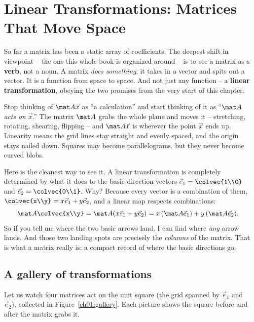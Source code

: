 \section{Linear Transformations: Matrices That Move Space}

So far a matrix has been a static array of coefficients. The deepest shift in viewpoint -- the one this
whole book is organized around -- is to see a matrix as a \textbf{verb}, not a noun. A matrix
\emph{does something}: it takes in a vector and spits out a vector. It is a function from space to
space. And not just any function -- a \textbf{linear transformation}, obeying the two promises from the
very start of this chapter.

\begin{intuitionbox}
Stop thinking of $\mat A\vec x$ as ``a calculation'' and start thinking of it as ``$\mat A$ \emph{acts
on} $\vec x$.'' The matrix $\mat A$ grabs the whole plane and moves it -- stretching, rotating,
shearing, flipping -- and $\mat A\vec x$ is wherever the point $\vec x$ ends up. Linearity means the
grid lines stay straight and evenly spaced, and the origin stays nailed down. Squares may become
parallelograms, but they never become curved blobs.
\end{intuitionbox}

Here is the cleanest way to see it. A linear transformation is completely determined by what it does
to the basic direction vectors $\vec e_1 = \colvec{1\\0}$ and $\vec e_2 = \colvec{0\\1}$. Why?
Because every vector is a combination of them, $\colvec{x\\y} = x\vec e_1 + y\vec e_2$, and a linear
map respects combinations:
\[
\mat A\colvec{x\\y} = \mat A(x\vec e_1 + y\vec e_2) = x\,(\mat A\vec e_1) + y\,(\mat A\vec e_2).
\]
So if you tell me where the two basic arrows land, I can find where \emph{any} arrow lands. And those
two landing spots are precisely the \emph{columns} of the matrix. That is what a matrix really is: a
compact record of where the basic directions go.

\subsection{A gallery of transformations}

Let us watch four matrices act on the unit square (the grid spanned by $\vec e_1$ and $\vec e_2$),
collected in Figure~\ref{ch01:gallery}. Each picture shows the square before and after the matrix
grabs it.

